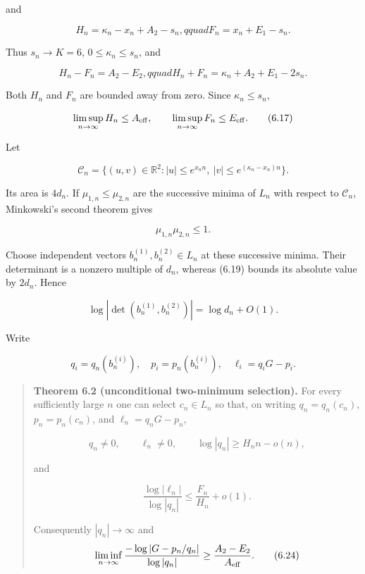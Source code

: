 \documentclass[
  11pt,
]{article}
\begin{document}
and

\[
 H_n=\kappa_n-x_n+A_2-s_n,qquad
 F_n=x_n+E_1-s_n.                                   \tag{6.15}
\]

Thus \(s_n\to K=6\), \(0\le\kappa_n\le s_n\), and

\[
 H_n-F_n=A_2-E_2,qquad
 H_n+F_n=\kappa_n+A_2+E_1-2s_n.                    \tag{6.16}
\]

Both \(H_n\) and \(F_n\) are bounded away from zero. Since
\(\kappa_n\le s_n\),

\[
 \limsup_{n\to\infty}H_n\le A_{\rm eff},\qquad
 \limsup_{n\to\infty}F_n\le E_{\rm eff}.           \tag{6.17}
\]

Let

\[
 \mathcal C_n=\{(u,v)\in\mathbb R^2:
 |u|\le e^{x_nn},\ |v|\le e^{(\kappa_n-x_n)n}\}.
 \tag{6.18}
\]

Its area is \(4d_n\). If \(\mu_{1,n}\le\mu_{2,n}\) are the successive
minima of \(L_n\) with respect to \(\mathcal C_n\), Minkowski's second
theorem gives

\[
 \mu_{1,n}\mu_{2,n}\le1.                           \tag{6.19}
\]

Choose independent vectors \(b_n^{(1)},b_n^{(2)}\in L_n\) at these
successive minima. Their determinant is a nonzero multiple of \(d_n\),
whereas (6.19) bounds its absolute value by \(2d_n\). Hence

\[
 \log|\det(b_n^{(1)},b_n^{(2)})|=\log d_n+O(1).      \tag{6.20}
\]

Write

\[
 q_i=q_n(b_n^{(i)}),\quad p_i=p_n(b_n^{(i)}),
 \quad \ell_i=q_iG-p_i.                              \tag{6.21}
\]

\begin{quote}
\textbf{Theorem 6.2 (unconditional two-minimum selection).} For every
sufficiently large \(n\) one can select \(c_n\in L_n\) so that, on
writing \(q_n=q_n(c_n)\), \(p_n=p_n(c_n)\), and \(\ell_n=q_nG-p_n\),

\[
q_n\ne0,\qquad \ell_n\ne0,\qquad
\log|q_n|\ge H_nn-o(n),                            \tag{6.22}
\]

and

\[
\frac{\log|\ell_n|}{\log|q_n|}
\le \frac{F_n}{H_n}+o(1).                         \tag{6.23}
\]

Consequently \(|q_n|\to\infty\) and \[
\liminf_{n\to\infty}
\frac{-\log|G-p_n/q_n|}{\log|q_n|}
\ge\frac{A_2-E_2}{A_{\rm eff}}.                   \tag{6.24}
\]
\end{quote}
\end{document}
